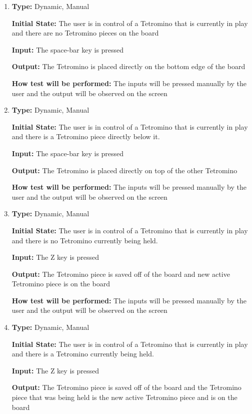 \documentclass[12pt, titlepage]{article}
\begin{document}
\begin{enumerate}[{FR-CI-}1. ]
		\item
		\textbf{Type:} Dynamic, Manual
		
		\textbf{Initial State:} The user is in control of a Tetromino that is currently in play and there are no Tetromino pieces on the board
		
		\textbf{Input:} The space-bar key is pressed 
		
		\textbf{Output:} The Tetromino is placed directly on the bottom edge of the board
		
		\textbf{How test will be performed:} The inputs will be pressed manually by the user and the output will be observed on the screen
		
		\item
		\textbf{Type:} Dynamic, Manual
		
		\textbf{Initial State:} The user is in control of a Tetromino that is currently in play and there is a Tetromino piece directly below it.
		
		\textbf{Input:} The space-bar key is pressed 
		
		\textbf{Output:} The Tetromino is placed directly on top of the other Tetromino
		
		\textbf{How test will be performed:} The inputs will be pressed manually by the user and the output will be observed on the screen
		
		\item
		\textbf{Type:} Dynamic, Manual
		
		\textbf{Initial State:} The user is in control of a Tetromino that is currently in play and there is no Tetromino currently being held.
		
		\textbf{Input:} The Z key is pressed 
		
		\textbf{Output:} The Tetromino piece is saved off of the board and new active Tetromino piece is on the board 
		
		\textbf{How test will be performed:} The inputs will be pressed manually by the user and the output will be observed on the screen
		
		\item
		\textbf{Type:} Dynamic, Manual
		
		\textbf{Initial State:} The user is in control of a Tetromino that is currently in play and there is a Tetromino currently being held.
		
		\textbf{Input:} The Z key is pressed 
		
		\textbf{Output:} The Tetromino piece is saved off of the board and the Tetromino piece that was being held is the new active Tetromino piece and is on the board 
		

\end{enumerate}
\end{document}
